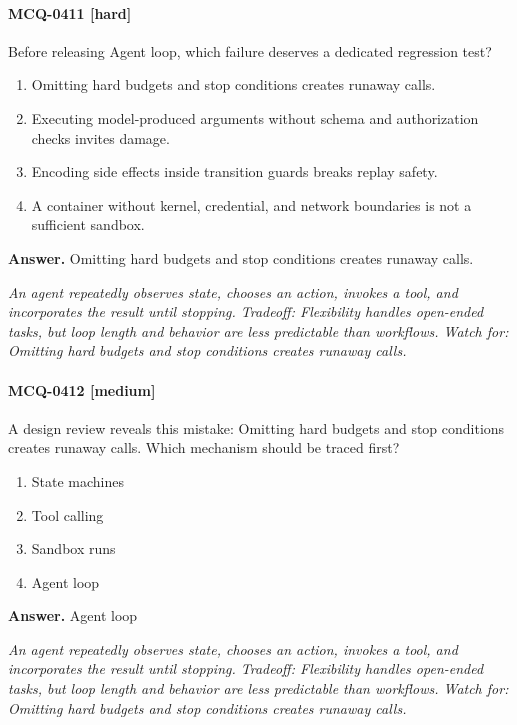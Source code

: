 \paragraph{MCQ-0411 [hard]} Before releasing Agent loop, which failure deserves a dedicated regression test?
\begin{enumerate}[label=\Alph*.]
\item Omitting hard budgets and stop conditions creates runaway calls.
\item Executing model-produced arguments without schema and authorization checks invites damage.
\item Encoding side effects inside transition guards breaks replay safety.
\item A container without kernel, credential, and network boundaries is not a sufficient sandbox.
\end{enumerate}
\noindent\textbf{Answer.} Omitting hard budgets and stop conditions creates runaway calls.
\par\textit{An agent repeatedly observes state, chooses an action, invokes a tool, and incorporates the result until stopping. Tradeoff: Flexibility handles open-ended tasks, but loop length and behavior are less predictable than workflows. Watch for: Omitting hard budgets and stop conditions creates runaway calls.}
\paragraph{MCQ-0412 [medium]} A design review reveals this mistake: Omitting hard budgets and stop conditions creates runaway calls. Which mechanism should be traced first?
\begin{enumerate}[label=\Alph*.]
\item State machines
\item Tool calling
\item Sandbox runs
\item Agent loop
\end{enumerate}
\noindent\textbf{Answer.} Agent loop
\par\textit{An agent repeatedly observes state, chooses an action, invokes a tool, and incorporates the result until stopping. Tradeoff: Flexibility handles open-ended tasks, but loop length and behavior are less predictable than workflows. Watch for: Omitting hard budgets and stop conditions creates runaway calls.}
